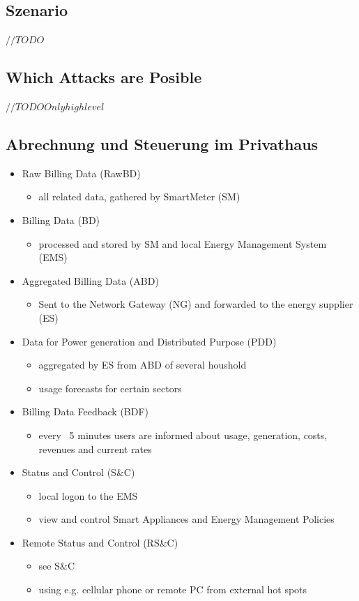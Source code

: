 \documentclass[a4paper, 12pt]{article}
\begin{document}
\subsection{Szenario}
$ //TODO $
\subsection{Which Attacks are Posible}
$ //TODO Only highlevel$
\subsection{Abrechnung und Steuerung im Privathaus}
\begin{itemize}

\item Raw Billing Data (RawBD)
\begin{itemize}
\item all related data, gathered by SmartMeter (SM)
\end{itemize}

\item Billing Data (BD)
\begin{itemize}
\item processed and stored by SM and local Energy Management System (EMS)
\end{itemize}

\item Aggregated Billing Data (ABD)
\begin{itemize}
\item Sent to the Network Gateway (NG) and forwarded to the energy supplier (ES)
\end{itemize}

\item Data for Power generation and Distributed Purpose (PDD)
\begin{itemize}
\item aggregated by ES from ABD of several houshold
\item usage forecasts for certain sectors
\end{itemize}

\item Billing Data Feedback (BDF)
\begin{itemize}
\item every ~5 minutes users are informed about usage, generation, costs, revenues and current rates
\end{itemize}

\item Status and Control (S\&C)
\begin{itemize}
\item local logon to the EMS
\item view and control Smart Appliances and Energy Management Policies
\end{itemize}

\item Remote Status and Control (RS\&C)
\begin{itemize}
\item see S\&C
\item using e.g. cellular phone or remote PC from external hot spots
\end{itemize}

\end{itemize}
\end{document}
